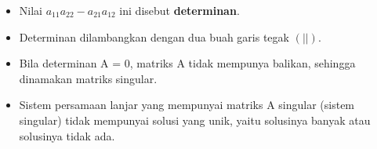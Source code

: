 \documentclass[pdflatex,compress,mathserif]{beamer}
\begin{document}
\begin{frame}
	\begin{itemize}
		\item Nilai $ a_{11} a_{22} - a_{21}a_{12} $ ini disebut \textbf{determinan}.
		\item Determinan dilambangkan dengan dua buah garis tegak $ (| |) $.
		\item Bila determinan A = 0, matriks A tidak mempunya
		balikan, sehingga dinamakan matriks singular.
		\item Sistem persamaan lanjar yang mempunyai matriks A
		singular (sistem singular) tidak mempunyai solusi
		yang unik, yaitu solusinya banyak atau solusinya tidak
		ada.
	\end{itemize}
\end{frame}
\end{document}
